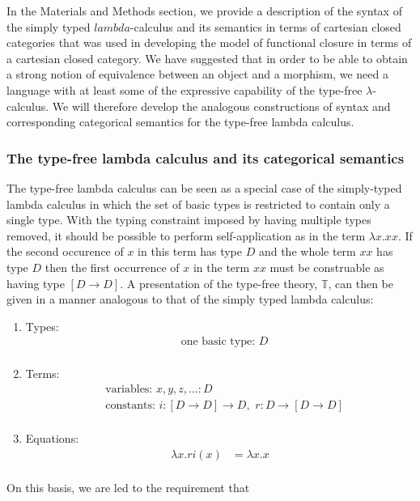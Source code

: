 In the Materials and Methods section, we provide a description of the syntax of the simply typed $lambda$-calculus and its semantics in terms of cartesian closed categories that was used in developing the model of functional closure in terms of a cartesian closed category. We have suggested that in order to be able to obtain a strong notion of equivalence between an object and a morphism, we need a language with at least some of the expressive capability of the type-free $\lambda$-calculus. We will therefore develop the analogous constructions of syntax and corresponding categorical semantics for the type-free lambda calculus.

\subsubsection*{The type-free lambda calculus and its categorical semantics}
The type-free lambda calculus can be seen as a special case of the simply-typed lambda calculus in which the set of basic types is restricted to contain only a single type. With the typing constraint imposed by having multiple types removed, it should be possible to perform self-application as in the term $\lambda x. xx$. If the second occurence of $x$ in this term has type $D$ and the whole term $xx$ has type $D$ then the first occurrence of $x$ in the term $xx$ must be construable as having type $[D \rightarrow D]$. A presentation of the type-free theory, $\mathbb{T}$, can then be given in a manner analogous to that of the simply typed lambda calculus:
\begin{enumerate}
\item{Types:}
\begin{align*}
&\mbox{one basic type: } D\\
\end{align*}
\item{Terms:}
\begin{align*}
&\mbox{variables: } x,y,z, \ldots \colon D\\
&\mbox{constants: } i \colon [D \rightarrow D] \rightarrow D,\,\, r \colon D \rightarrow [D \rightarrow D]\\ 
\end{align*}
\item{Equations:}
\begin{align*}
            \lambda x. ri(x) &= \lambda x.x\\
\end{align*}
\end{enumerate}
On this basis, we are led to the requirement that
